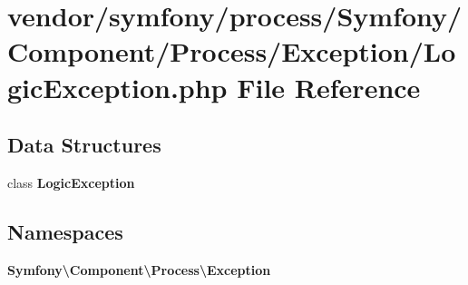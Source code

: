 \section{vendor/symfony/process/\+Symfony/\+Component/\+Process/\+Exception/\+Logic\+Exception.php File Reference}
\label{_logic_exception_8php}
\subsection*{Data Structures}
\begin{DoxyCompactItemize}
\item 
class {\bf Logic\+Exception}
\end{DoxyCompactItemize}
\subsection*{Namespaces}
\begin{DoxyCompactItemize}
\item 
 {\bf Symfony\textbackslash{}\+Component\textbackslash{}\+Process\textbackslash{}\+Exception}
\end{DoxyCompactItemize}
